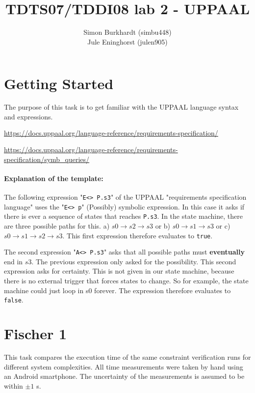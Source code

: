 \documentclass[10pt,bibliography=totocnumbered,listof=totocnumbered, footsepline, headsepline]{scrreprt}
\begin{document}
\title{TDTS07/TDDI08 lab 2 - UPPAAL}
\author{Simon Burkhardt (simbu448)\\ Jule Eninghorst (julen905)}
\maketitle

\section{Getting Started}

The purpose of this task is to get familiar with the UPPAAL language syntax and expressions.

\url{https://docs.uppaal.org/language-reference/requirements-specification/}

\url{https://docs.uppaal.org/language-reference/requirements-specification/symb\_queries/}

\paragraph{Explanation of the template:} The following expression "\texttt{E<> P.s3}" of the UPPAAL "requirements specification language" uses the "\texttt{E<> p}" (Possibly) symbolic expression. In this case it asks if there is ever a sequence of states that reaches \texttt{P.s3}. In the state machine, there are three possible paths for this. a) $s0 \rightarrow s2 \rightarrow s3$ or b) $s0\rightarrow s1 \rightarrow s3$ or c) $s0 \rightarrow s1 \rightarrow s2 \rightarrow s3$. This first expression therefore evaluates to \texttt{true}.

The second expression "\texttt{A<> P.s3}" asks that all possible paths must \textbf{eventually} end in $s3$. The previous expression only asked for the possibility. This second expression asks for certainty. This is not given in our state machine, because there is no external trigger that forces states to change. So for example, the state machine could just loop in s0 forever. The expression therefore evaluates to \texttt{false}.

\section{Fischer 1}

This task compares the execution time of the same constraint verification runs for different system complexities. All time measurements were taken by hand using an Android smartphone. The uncertainty of the measurements is assumed to be within $\pm1$ s.
\end{document}
